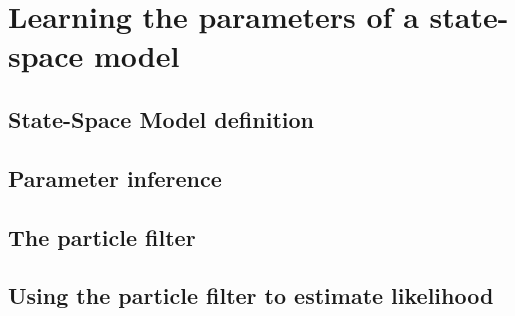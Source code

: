 \chapter{Learning the parameters of a state-space model}
\label{chap:inference}

\section{State-Space Model definition}

\section{Parameter inference}

\section{The particle filter}

\section{Using the particle filter to estimate likelihood}